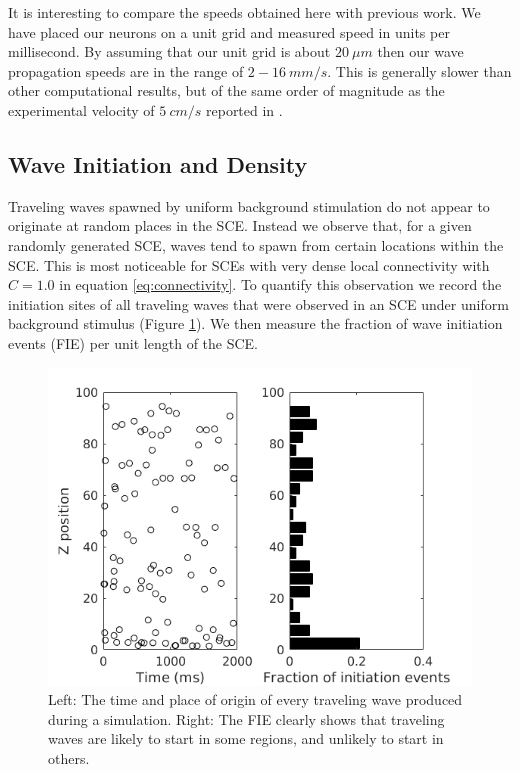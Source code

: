 \documentclass[12pt]{article}
\begin{document}
\color{red}
It is interesting to compare the speeds obtained here with previous work.
We have placed our neurons on a unit grid and measured speed in units per millisecond.
By assuming that our unit grid is about $20~\mu m$ \parencite{cruz2005} then our wave propagation speeds are in the range of $2-16~mm/s$.
This is generally slower than other computational results, but of the same order of magnitude as the experimental velocity of $5~cm/s$ reported in \parencite{Golomb1997}.
\color{black}

\FloatBarrier


\subsection{Wave Initiation and Density} \label{sub:wave_initiation}
Traveling waves spawned by uniform background stimulation do not appear to originate at random places in the SCE.
Instead we observe that, for a given randomly generated SCE, waves tend to spawn from certain locations within the SCE.
This is most noticeable for SCEs with very dense local connectivity with $C=1.0$ in equation \ref{eq:connectivity}.
To quantify this observation we record the initiation sites of all traveling waves that were observed in an SCE under uniform background stimulus (Figure \ref{fig:wave_initiation_sites}).
We then measure the fraction of wave initiation events (FIE) per unit length of the SCE.

\begin{figure}[!htb]
 \caption{Left: The time and place of origin of every traveling wave produced during a simulation. Right: The FIE clearly shows that traveling waves are likely to start in some regions, and unlikely to start in others.}
 \label{fig:wave_initiation_sites}
 \centering
   \includegraphics[width=\textwidth]{fig/InitiationSites_100sims}
\end{figure}
\end{document}
